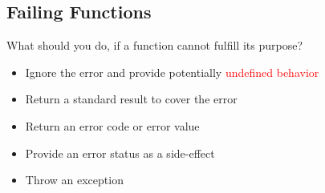 \subsection{Failing Functions}
What should you do, if a function cannot fulfill its purpose?
\begin{itemize}
    \item Ignore the error and provide potentially \textcolor{red}{undefined behavior}
    \item Return a standard result to cover the error
    \item Return an error code or error value
    \item Provide an error status as a side-effect
    \item Throw an exception
\end{itemize}

